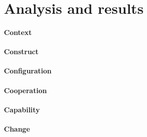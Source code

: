 \section{Analysis and results}
\paragraph{Context}
\paragraph{Construct}
\paragraph{Configuration}
\paragraph{Cooperation}
\paragraph{Capability}
\paragraph{Change}